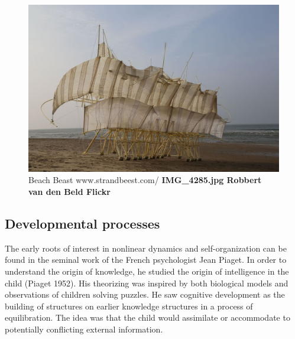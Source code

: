 \documentclass[
  a4paper,
  DIV=11,
  numbers=noendperiod]{scrreprt}
\begin{document}
\begin{figure}

{\centering \includegraphics{media/ch5n/image8b.png}

}

\caption{\label{fig-ch5n-img8-old-46}Beach Beast \textbar{}
www.strandbeest.com/ \textbf{IMG\_4285.jpg \textbar{} Robbert van den
Beld \textbar{} Flickr}}

\end{figure}

\hypertarget{sec-Developmental-processes}{%
\subsection{Developmental processes}\label{sec-Developmental-processes}}

The early roots of interest in nonlinear dynamics and self-organization
can be found in the seminal work of the French psychologist Jean Piaget.
In order to understand the origin of knowledge, he studied the origin of
intelligence in the child (Piaget 1952). His theorizing was inspired by
both biological models and observations of children solving puzzles. He
saw cognitive development as the building of structures on earlier
knowledge structures in a process of equilibration. The idea was that
the child would assimilate or accommodate to potentially conflicting
external information.
\end{document}

